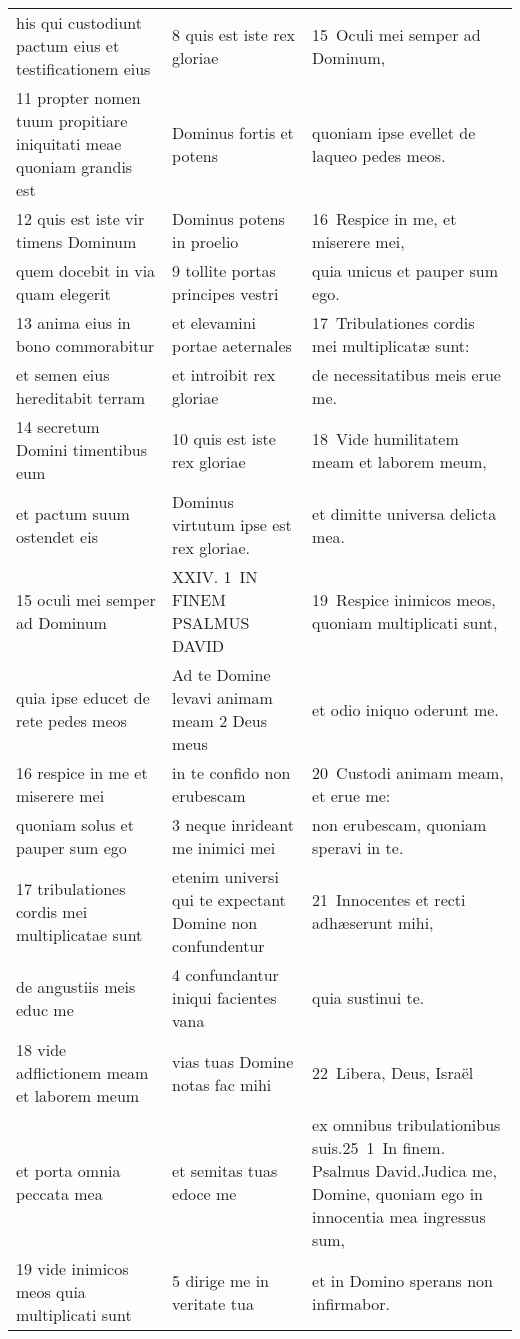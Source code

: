\documentclass{article}
\begin{document}
\begin{longtable}{@{}p{}p{}p{}@{}}
his qui custodiunt pactum eius et testificationem eius	&	8 quis est iste rex gloriae	&	15 Oculi mei semper ad Dominum,	\\
11 propter nomen tuum propitiare iniquitati meae quoniam grandis est	&	Dominus fortis et potens	&	quoniam ipse evellet de laqueo pedes meos.	\\
12 quis est iste vir timens Dominum	&	Dominus potens in proelio	&	16 Respice in me, et miserere mei,	\\
quem docebit in via quam elegerit	&	9 tollite portas principes vestri	&	quia unicus et pauper sum ego.	\\
13 anima eius in bono commorabitur	&	et elevamini portae aeternales	&	17 Tribulationes cordis mei multiplicatæ sunt:	\\
et semen eius hereditabit terram	&	et introibit rex gloriae	&	de necessitatibus meis erue me.	\\
14 secretum Domini timentibus eum	&	10 quis est iste rex gloriae	&	18 Vide humilitatem meam et laborem meum,	\\
et pactum suum ostendet eis	&	Dominus virtutum ipse est rex gloriae.	&	et dimitte universa delicta mea.	\\
15 oculi mei semper ad Dominum	&	XXIV. 1 IN FINEM PSALMUS DAVID	&	19 Respice inimicos meos, quoniam multiplicati sunt,	\\
quia ipse educet de rete pedes meos	&	Ad te Domine levavi animam meam 2 Deus meus	&	et odio iniquo oderunt me.	\\
16 respice in me et miserere mei	&	in te confido non erubescam	&	20 Custodi animam meam, et erue me:	\\
quoniam solus et pauper sum ego	&	3 neque inrideant me inimici mei	&	non erubescam, quoniam speravi in te.	\\
17 tribulationes cordis mei multiplicatae sunt	&	etenim universi qui te expectant Domine non confundentur	&	21 Innocentes et recti adhæserunt mihi,	\\
de angustiis meis educ me	&	4 confundantur iniqui facientes vana	&	quia sustinui te.	\\
18 vide adflictionem meam et laborem meum	&	vias tuas Domine notas fac mihi	&	22 Libera, Deus, Israël	\\
et porta omnia peccata mea	&	et semitas tuas edoce me	&	ex omnibus tribulationibus suis.25 1 In finem. Psalmus David.Judica me, Domine, quoniam ego in innocentia mea ingressus sum,	\\
19 vide inimicos meos quia multiplicati sunt	&	5 dirige me in veritate tua	&	et in Domino sperans non infirmabor.	\\

\end{longtable}
\end{document}
